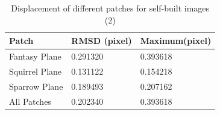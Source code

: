 \begin{table}[htbp]
	\centering
	\scriptsize 
	\begin{tabular}{p{80pt} p{60pt} p{60pt}}
		\toprule
		Patch & {\bfseries RMSD (pixel)} & {\bfseries Maximum(pixel)}\\ \midrule
		Fantasy Plane&  0.291320&0.393618 \\
		\addlinespace[3pt]
		Squirrel Plane  &  0.131122&0.154218 \\
		\addlinespace[3pt]
		Sparrow Plane & 0.189493&0.207162 \\ 
		\addlinespace[3pt]
		All Patches & 0.202340&0.393618 \\ \bottomrule
	\end{tabular}
	\caption{Displacement of different patches for self-built images (2)}  
	\label{tab:Displacement of different patches for self-built images (2)} 
\end{table}

